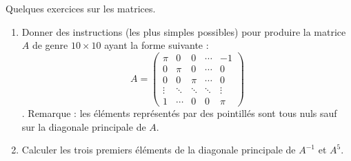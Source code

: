 \begin{exercice}\label{exoSC_serie1-0004}

	Quelques exercices sur les matrices.
	\begin{enumerate}

		\item
			Donner des instructions (les plus simples possibles) pour produire la matrice $A$ de genre $10\times 10$ ayant la forme suivante :
			\begin{equation}
				A=\begin{pmatrix}
					\pi	&	0	&	0	&	\cdots	&	-1\\	
					0	&	\pi	&	0	&	\cdots	&	0\\	
					0	&	0	&	\pi	&	\cdots	&	0\\	
					\vdots	&	\ddots	&	\ddots	&	\ddots	&	\vdots\\	
					1	&	\cdots	&	0	&	0	&	\pi
				\end{pmatrix}
			\end{equation}.
			Remarque : les éléments représentés par des pointillés sont tous nuls sauf sur la diagonale principale de $A$.
		\item
			Calculer les trois premiers éléments de la diagonale principale de $A^{-1}$ et $A^5$.
	\end{enumerate}

\end{exercice}
